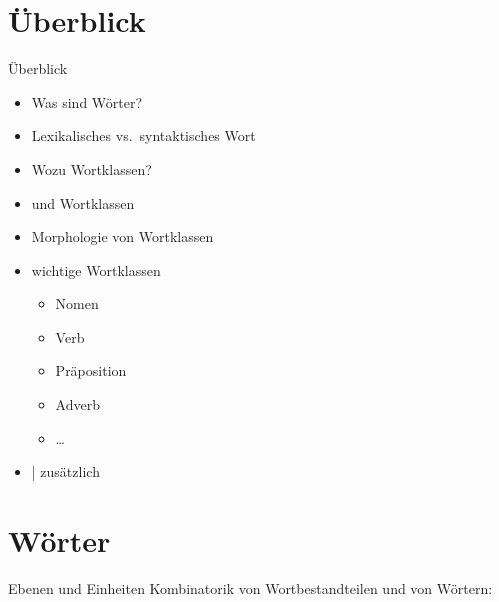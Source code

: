 \section{Überblick}

\begin{frame}
  {Überblick}
  \pause
  \begin{itemize}[<+->]
    \item Was sind Wörter?
    \item Lexikalisches vs.\ syntaktisches Wort
      \Halbzeile
    \item Wozu Wortklassen?
    \item {} und Wortklassen
    \item \alert{Morphologie} von Wortklassen
      \Halbzeile
    \item wichtige Wortklassen
      \begin{itemize}[<+->]
        \item Nomen
        \item Verb
        \item Präposition
        \item Adverb
        \item \ldots
      \end{itemize}
      \Halbzeile
    \item \citet[Kap.~6]{Schaefer2018b} | zusätzlich \citet{Engel2009}
  \end{itemize}
\end{frame}


\section{Wörter}

\begin{frame}
  {Ebenen und Einheiten}
  \pause
  Kombinatorik von Wortbestandteilen und von Wörtern:
  \pause
  \Zeile
  \begin{exe}
    \ex
    \begin{xlist}
      \pause
    \end{xlist}
    \pause
    \Zeile
    \ex
    \begin{xlist}
      \pause
    \end{xlist}
  \end{exe}
\end{frame}

